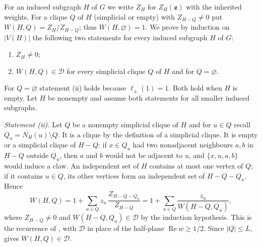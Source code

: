 \documentclass[11pt]{article}
\theoremstyle{remark}
\renewcommand{\Re}{\operatorname{Re}}
\newcommand{\D}{\mathcal D}
\begin{document}
For an induced subgraph $H$ of $G$ we write $Z_H$ for $Z_H(\boldsymbol z)$ with the inherited weights. For a clique
$Q$ of $H$ (simplicial or empty) with $Z_{H-Q}\ne0$ put $W(H,Q)=Z_H/Z_{H-Q}$; thus $W(H,\varnothing)=1$. We prove by induction on $|V(H)|$
the following two statements for every induced subgraph $H$ of $G$:
\begin{enumerate}[label=(\roman*)]
\item $Z_H\ne0$;
\item $W(H,Q)\in\D$ for every simplicial clique $Q$ of $H$ and for $Q=\varnothing$.
\end{enumerate}
For $Q=\varnothing$ statement (ii) holds because $\ell_\pm(1)=1$.
Both hold when $H$ is empty. Let $H$ be nonempty and assume both statements for all smaller induced subgraphs.

\medskip\noindent\emph{Statement (ii).}
Let $Q$ be a nonempty simplicial clique of $H$ and for $u\in Q$ recall $Q_u=N_H(u)\setminus Q$. It is a clique by the
definition of a simplicial clique. It is empty or a simplicial clique of $H-Q$: if $x\in Q_u$ had two nonadjacent neighbours
$a,b$ in $H-Q$ outside $Q_u$, then $a$ and $b$ would not be adjacent to $u$, and $\{x,u,a,b\}$ would induce a claw.
An independent set of $H$ contains at most one vertex of $Q$; if it contains $u\in Q$, its other vertices form an
independent set of $H-Q-Q_u$. Hence
\[
W(H,Q)=1+\sum_{u\in Q}z_u\,\frac{Z_{H-Q-Q_u}}{Z_{H-Q}}=1+\sum_{u\in Q}\frac{z_u}{W(H-Q,Q_u)},
\]
where $Z_{H-Q}\ne0$ and $W(H-Q,Q_u)\in\D$ by the induction hypothesis. This is the recurrence of \cite[Lemma~12]{JP},
with $\D$ in place of the half-plane $\Re w\ge1/2$. Since $|Q|\le L$,  gives $W(H,Q)\in\D$.
\end{document}

